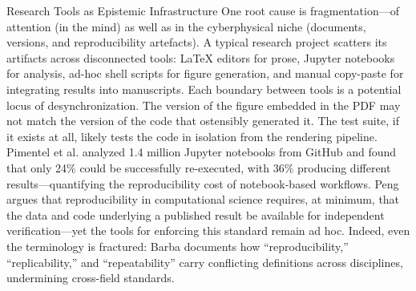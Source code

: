 \documentclass[
  ignorenonframetext,
]{beamer}
\begin{document}
\begin{frame}[allowframebreaks]{Research Tools as Epistemic
Infrastructure}
One root cause is fragmentation---of attention (in the mind) as well as
in the cyberphysical niche (documents, versions, and reproducibility
artefacts). A typical research project scatters its artifacts across
disconnected tools: LaTeX editors  for prose,
Jupyter notebooks for analysis, ad-hoc shell scripts for figure
generation, and manual copy-paste for integrating results into
manuscripts. Each boundary between tools is a potential locus of
desynchronization. The version of the figure embedded in the PDF may not
match the version of the code that ostensibly generated it. The test
suite, if it exists at all, likely tests the code in isolation from the
rendering pipeline. Pimentel et al.  analyzed
1.4 million Jupyter notebooks from GitHub and found that only 24\% could
be successfully re-executed, with 36\% producing different
results---quantifying the reproducibility cost of notebook-based
workflows. Peng  argues that reproducibility
in computational science requires, at minimum, that the data and code
underlying a published result be available for independent
verification---yet the tools for enforcing this standard remain ad hoc.
Indeed, even the terminology is fractured: Barba
 documents how ``reproducibility,''
``replicability,'' and ``repeatability'' carry conflicting definitions
across disciplines, undermining cross-field standards.
\end{frame}
\end{document}
